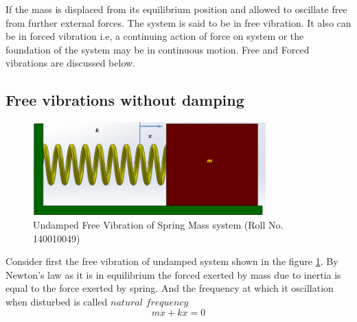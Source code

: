 \documentclass[12pt, a4paper]{article}
\begin{document}
If the mass is displaced from its equilibrium position and allowed to oscillate free from further external forces. The system is said to be in free vibration. It also can be in forced vibration i.e, a continuing action of force on system or the foundation of the system may be in continuous motion. Free and Forced vibrations are discussed below.
\subsection{Free vibrations without damping}
\begin{figure}[h]
\includegraphics[width=0.8\textwidth]{Undamped_free_vibrations.png}
\caption{Undamped Free Vibration of Spring Mass system (Roll No. 140010049)}
\label{fig:undamped}
\end{figure}
Consider first the free vibration of undamped system shown in the  figure \ref{fig:undamped}. By Newton's law as it is in equilibrium the forced exerted by mass due to inertia is equal to the force exerted by spring. And the frequency at which it oscillation when disturbed is called $natural$ $frequency$\\
\begin{equation} 
m\ddot{x} + kx = 0
\label{undamped-newton}
\end{equation}
\end{document}
